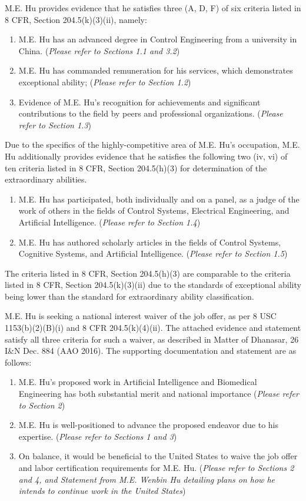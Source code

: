 \documentclass{article}
\begin{document}
M.E. Hu provides evidence that he satisfies three (A, D, F) of six criteria listed in 8 CFR, Section 204.5(k)(3)(ii), namely:
\begin{enumerate}
    \item M.E. Hu has an advanced degree in Control Engineering from a university in China. ({\it Please refer to Sections 1.1 and 3.2})
    \item M.E. Hu has commanded remuneration for his services, which demonstrates exceptional ability; ({\it Please refer to Section 1.2})
    \item Evidence of M.E. Hu's recognition for achievements and significant contributions to the field by peers and professional organizations. ({\it Please refer to Section 1.3})
\end{enumerate}
Due to the specifics of the highly-competitive area of M.E. Hu's occupation, M.E. Hu additionally provides evidence that he satisfies the following two (iv, vi) of ten criteria listed in 8 CFR, Section 204.5(h)(3) for determination of the extraordinary abilities. 
\begin{enumerate}
    \item M.E. Hu has participated, both individually and on a panel, as a judge of the work of others in the fields of Control Systems, Electrical Engineering, and Artificial Intelligence. ({\it Please refer to Section 1.4})
    \item M.E. Hu has authored scholarly articles in the fields of Control Systems, Cognitive Systems, and Artificial Intelligence. ({\it Please refer to Section 1.5})
\end{enumerate}

The criteria listed in 8 CFR, Section 204.5(h)(3) are comparable to the criteria listed in 8 CFR, Section 204.5(k)(3)(ii) due to the standards of exceptional ability being lower than the standard for extraordinary ability classification.

M.E. Hu is seeking a national interest waiver of the job offer, as per 8 USC 1153(b)(2)(B)(i) and 8 CFR  204.5(k)(4)(ii). The attached evidence and statement satisfy all three criteria for such a waiver, as described in Matter of Dhanasar, 26 I\&N Dec. 884 (AAO 2016). The supporting documentation and statement are as follows:

\begin{enumerate}
    \item M.E. Hu’s proposed work in Artificial Intelligence and Biomedical Engineering has both substantial merit and national importance ({\it Please refer to Section 2})
    \item M.E. Hu is well-positioned to advance the proposed endeavor due to his expertise. ({\it Please refer to Sections 1 and 3})
    \item On balance, it would be beneficial to the United States to waive the job offer and labor certification requirements for M.E. Hu. ({\it Please refer to Sections 2 and 4, and Statement from M.E. Wenbin Hu detailing plans on how he intends to continue work in the United States})
\end{enumerate}
\end{document}
